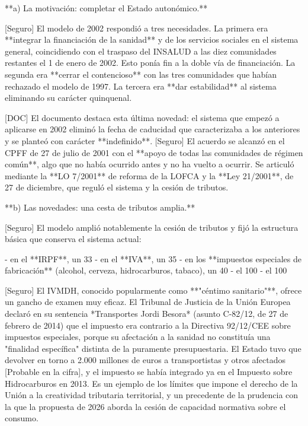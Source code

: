 \documentclass[10pt,a4paper]{article}
\begin{document}
**a) La motivación: completar el Estado autonómico.**

[Seguro] El modelo de 2002 respondió a tres necesidades. La primera era **integrar la financiación de la sanidad** y de los servicios sociales en el sistema general, coincidiendo con el traspaso del INSALUD a las diez comunidades restantes el 1 de enero de 2002. Esto ponía fin a la doble vía de financiación. La segunda era **cerrar el contencioso** con las tres comunidades que habían rechazado el modelo de 1997. La tercera era **dar estabilidad** al sistema eliminando su carácter quinquenal.

[DOC] El documento destaca esta última novedad: el sistema que empezó a aplicarse en 2002 eliminó la fecha de caducidad que caracterizaba a los anteriores y se planteó con carácter **indefinido**. [Seguro] El acuerdo se alcanzó en el CPFF de 27 de julio de 2001 con el **apoyo de todas las comunidades de régimen común**, algo que no había ocurrido antes y no ha vuelto a ocurrir. Se articuló mediante la **LO 7/2001** de reforma de la LOFCA y la **Ley 21/2001**, de 27 de diciembre, que reguló el sistema y la cesión de tributos.

**b) Las novedades: una cesta de tributos amplia.**

[Seguro] El modelo amplió notablemente la cesión de tributos y fijó la estructura básica que conserva el sistema actual:

- en el **IRPF**, un 33%
- en el **IVA**, un 35%
- en los **impuestos especiales de fabricación** (alcohol, cerveza, hidrocarburos, tabaco), un 40%
- el 100%
- el 100%

[Seguro] El IVMDH, conocido popularmente como **"céntimo sanitario"**, ofrece un gancho de examen muy eficaz. El Tribunal de Justicia de la Unión Europea declaró en su sentencia *Transportes Jordi Besora* (asunto C-82/12, de 27 de febrero de 2014) que el impuesto era contrario a la Directiva 92/12/CEE sobre impuestos especiales, porque su afectación a la sanidad no constituía una "finalidad específica" distinta de la puramente presupuestaria. El Estado tuvo que devolver en torno a 2.000 millones de euros a transportistas y otros afectados [Probable en la cifra], y el impuesto se había integrado ya en el Impuesto sobre Hidrocarburos en 2013. Es un ejemplo de los límites que impone el derecho de la Unión a la creatividad tributaria territorial, y un precedente de la prudencia con la que la propuesta de 2026 aborda la cesión de capacidad normativa sobre el consumo.
\end{document}
